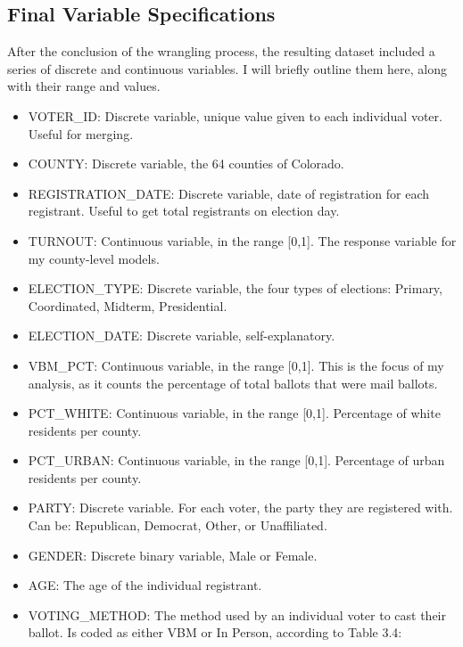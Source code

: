 \documentclass[12pt,twoside]{reedthesis}
\providecommand{\tightlist}{%
  \setlength{\itemsep}{0pt}\setlength{\parskip}{0pt}}
\begin{document}
  \subsection{Final Variable
  Specifications}\label{final-variable-specifications}
  
  After the conclusion of the wrangling process, the resulting dataset
  included a series of discrete and continuous variables. I will briefly
  outline them here, along with their range and values.
  
  \begin{itemize}
  \tightlist
  \item
    VOTER\_ID: Discrete variable, unique value given to each individual
    voter. Useful for merging.
  \item
    COUNTY: Discrete variable, the 64 counties of Colorado.
  \item
    REGISTRATION\_DATE: Discrete variable, date of registration for each
    registrant. Useful to get total registrants on election day.
  \item
    TURNOUT: Continuous variable, in the range {[}0,1{]}. The response
    variable for my county-level models.
  \item
    ELECTION\_TYPE: Discrete variable, the four types of elections:
    Primary, Coordinated, Midterm, Presidential.
  \item
    ELECTION\_DATE: Discrete variable, self-explanatory.
  \item
    VBM\_PCT: Continuous variable, in the range {[}0,1{]}. This is the
    focus of my analysis, as it counts the percentage of total ballots
    that were mail ballots.
  \item
    PCT\_WHITE: Continuous variable, in the range {[}0,1{]}. Percentage of
    white residents per county.
  \item
    PCT\_URBAN: Continuous variable, in the range {[}0,1{]}. Percentage of
    urban residents per county.
  \item
    PARTY: Discrete variable. For each voter, the party they are
    registered with. Can be: Republican, Democrat, Other, or Unaffiliated.
  \item
    GENDER: Discrete binary variable, Male or Female.
  \item
    AGE: The age of the individual registrant.
  \item
    VOTING\_METHOD: The method used by an individual voter to cast their
    ballot. Is coded as either VBM or In Person, according to Table 3.4:
  \end{itemize}
  
\end{document}
